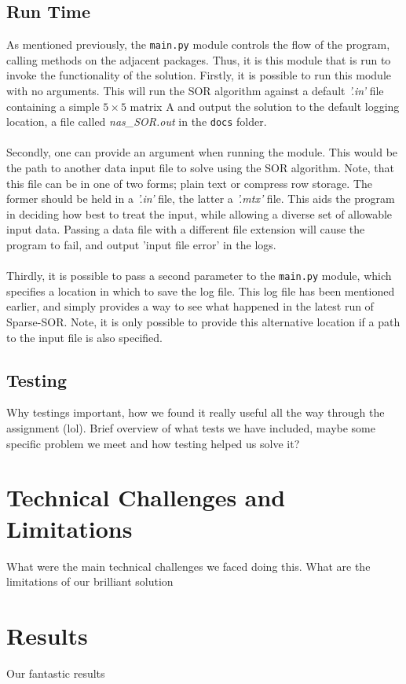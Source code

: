 \documentclass[paper=a4, fontsize=10pt]{scrartcl} %
\begin{document}
\subsection {Run Time}
{As mentioned previously, the \texttt{main.py} module controls the flow of the program, calling methods on the adjacent packages. Thus, it is this module that is run to invoke the functionality of the solution. Firstly, it is possible to run this module with no arguments. This will run the SOR algorithm against a default {\it '.in'} file containing a simple $5 \times 5$ matrix A and output the solution to the default logging location, a file called {\it nas\_SOR.out} in the \texttt {docs} folder.\\\\ Secondly, one can provide an argument when running the module. This would be the path to another data input file to solve using the SOR algorithm. Note, that this file can be in one of two forms; plain text or compress row storage. The former should be held in a {\it '.in'} file, the latter a {\it '.mtx'} file. This aids the program in deciding how best to treat the input, while allowing a diverse set of allowable input data. Passing a data file with a different file extension will cause the program to fail, and output 'input file error' in the logs.\\\\Thirdly, it is possible to pass a second parameter to the \texttt{main.py} module, which specifies a location in which to save the log file. This log file has been mentioned earlier, and simply provides a way to see what happened in the latest run of Sparse-SOR. Note, it is only possible to provide this alternative location if a path to the input file is also specified.    }
\subsection {Testing}
{Why testings important, how we found it really useful all the way through the assignment (lol). Brief overview of what tests we have included, maybe some specific problem we meet and how testing helped us solve it?}
\clearpage
\section{Technical Challenges and Limitations}
{What were the main technical challenges we faced doing this. What are the limitations of our brilliant solution }
\clearpage
\section{Results}
{Our fantastic results}
\end{document}
